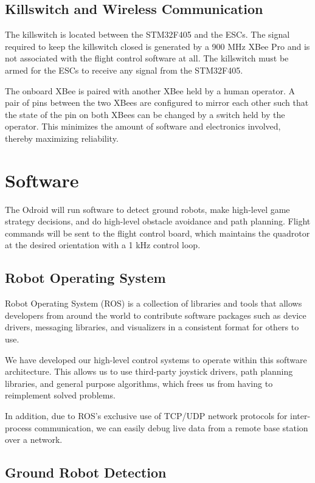 \documentclass[12pt,letterpaper]{article} \usepackage[margin=1in]{geometry}
\begin{document}
\subsection*{Killswitch and Wireless Communication}

The killswitch is located between the STM32F405 and the ESCs. The signal
required to keep the killswitch closed is generated by a 900 MHz XBee Pro and is
not associated with the flight control software at all. The killswitch must be
armed for the ESCs to receive any signal from the STM32F405.

The onboard XBee is paired with another XBee held by a human operator. A pair
of pins between the two XBees are configured to mirror each other such that the
state of the pin on both XBees can be changed by a switch held by the operator.
This minimizes the amount of software and electronics involved, thereby
maximizing reliability.


\section*{Software}

The Odroid will run software to detect ground robots, make high-level game
strategy decisions, and do high-level obstacle avoidance and path planning.
Flight commands will be sent to the flight control board, which maintains the
quadrotor at the desired orientation with a 1 kHz control loop.


\subsection*{Robot Operating System}

Robot Operating System (ROS) is a collection of libraries and tools that allows
developers from around the world to contribute software packages such as device
drivers, messaging libraries, and visualizers in a consistent format for others
to use.

We have developed our high-level control systems to operate within this
software architecture. This allows us to use third-party joystick drivers, path
planning libraries, and general purpose algorithms, which frees us from having
to reimplement solved problems.

In addition, due to ROS's exclusive use of TCP/UDP network protocols for
inter-process communication, we can easily debug live data from a remote base
station over a network.


\subsection*{Ground Robot Detection}
\end{document}
